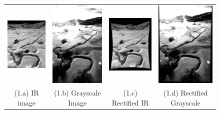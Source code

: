 \documentclass[runningheads]{llncs}
\begin{document}
\begin{figure}
  \centering
  \begin{tabular}{cccc}
    \includegraphics[width=3cm]{img/fusion/Roth/Infrared_Image_screenshot.png} &
    \includegraphics[width=3cm]{img/fusion/Roth/Grayscale_Image_screenshot.png} &
    \includegraphics[width=3cm]{img/fusion/Roth/Warped_Infrared_Image_screenshot.png} &
    \includegraphics[width=3cm]{img/fusion/Roth/Warped_Grayscale_Image_screenshot.png} \\
    \small (1.a) IR image & 
    \small (1.b) Grayscale Image &
    \small (1.c) Rectified IR &
    \small (1.d) Rectified Grayscale
  \end{tabular}

  \vspace{\floatsep}
  

\end{figure}
\end{document}
